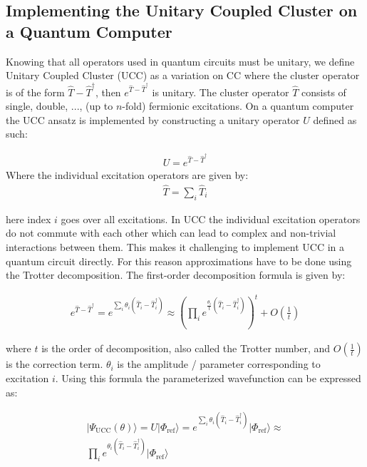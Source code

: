 \documentclass[twoside,twocolumn,9pt]{article}
\begin{document}
\subsection{Implementing the Unitary Coupled Cluster on a Quantum Computer}

Knowing that all operators used in quantum circuits must be unitary, we define Unitary Coupled Cluster \cite{Anand2022} (UCC) as a variation on CC where the cluster operator is of the form $\hat{T}-\hat{T}^{\dagger}$, then $e^{\hat{T}-\hat{T}^{\dagger}}$ is unitary. The cluster operator $\hat{T}$ consists of single, double, ..., (up to $n$-fold) fermionic excitations. On a quantum computer the UCC ansatz is implemented by constructing a unitary operator $U$ defined as such:

\begin{align}
U=e^{\hat{T}-\hat{T}^{\dagger}}
\end{align}
Where the individual excitation operators are given by:
\begin{align}
\hat{T}=\sum\limits_{i}\hat{T}_i
\end{align}

here index $i$ goes over all excitations. In UCC the individual excitation operators do not commute with each other which can lead to complex and non-trivial interactions between them. This makes it challenging to implement UCC in a quantum circuit directly. For this reason approximations have to be done using the Trotter decomposition. The first-order decomposition formula is given by:

\begin{align}
e^{\hat{T}-\hat{T}^{\dagger}}=e^{\sum\limits_{i}\theta_i(\hat{T}_i-\hat{T}_i^{\dagger})}\approx(\prod\limits_{i}e^{\frac{\theta_i}{t}(\hat{T}_i-\hat{T}_i^{\dagger})})^t+O(\frac{1}{t})
\end{align}

where $t$ is the order of decomposition, also called the Trotter number, and $O(\frac{1}{t})$ is the correction term. $\theta_i$ is the amplitude / parameter corresponding to excitation $i$. Using this formula the parameterized wavefunction can be expressed as:

\begin{align}
  |\Psi_{\text{UCC}}(\theta)\rangle=U|\Phi_{\text{ref}}\rangle=e^{\sum\limits_{i}\theta_i(\hat{T}_i-\hat{T}_i^{\dagger})}|\Phi_{\text{ref}}\rangle\approx\\\prod\limits_{i}e^{\theta_i(\hat{T}_i-\hat{T}_i^{\dagger})}|\Phi_{\text{ref}}\rangle
\end{align}
\end{document}
